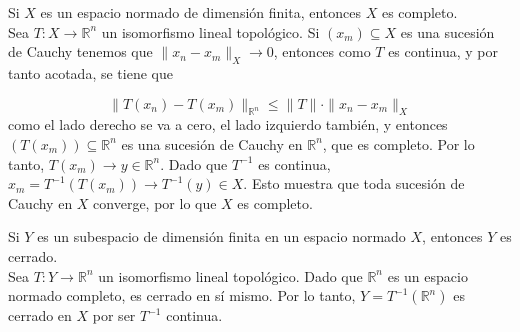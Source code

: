 \begin{ejercicio}
    Si $X$ es un espacio normado de dimensión finita, entonces $X$ es completo. \\ 
    \noindent
    Sea $T: X \to \mathbb{R}^n$ un isomorfismo lineal topológico. Si $(x_m) \subseteq X$ es una sucesión de Cauchy tenemos que $\|x_n - x_m\|_X \to 0$, entonces como $T$ es continua, y por tanto acotada, se tiene que

    $$\|T(x_n) - T(x_m)\|_{\mathbb{R}^n} \le \|T\| \cdot \|x_n - x_m\|_X$$
    como el lado derecho se va a cero, el lado izquierdo también, y entonces $(T(x_m)) \subseteq \mathbb{R}^n$ es una sucesión de Cauchy en $\mathbb{R}^n$, que es completo. Por lo tanto, $T(x_m) \to y \in \mathbb{R}^n$. Dado que $T^{-1}$ es continua, $x_m = T^{-1}(T(x_m)) \to T^{-1}(y) \in X$. Esto muestra que toda sucesión de Cauchy en $X$ converge, por lo que $X$ es completo.
\end{ejercicio}

\begin{ejercicio}
    Si $Y$ es un subespacio de dimensión finita en un espacio normado $X$, entonces $Y$ es cerrado. \\
    \noindent
    Sea $T: Y \to \mathbb{R}^n$ un isomorfismo lineal topológico. Dado que $\mathbb{R}^n$ es un espacio normado completo, es cerrado en sí mismo. Por lo tanto, $Y = T^{-1}(\mathbb{R}^n)$ es cerrado en $X$ por ser $T^{-1}$ continua.
\end{ejercicio}


